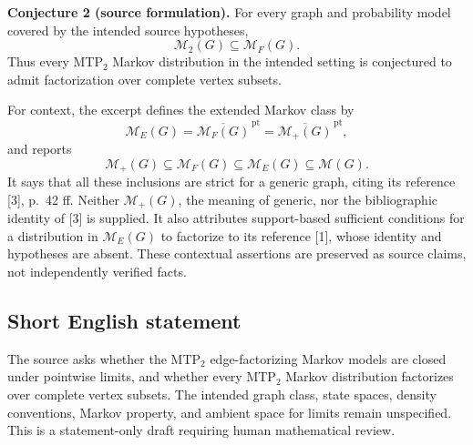 \documentclass[11pt]{article}
\begin{document}
\textbf{Conjecture 2 (source formulation).} For every graph and probability model covered by the intended source hypotheses,
\[
\mathcal M_2(G)\subseteq\mathcal M_F(G).
\]
Thus every MTP\(_2\) Markov distribution in the intended setting is conjectured to admit factorization over complete vertex subsets.

For context, the excerpt defines the extended Markov class by
\[
\mathcal M_E(G)=\overline{\mathcal M_F(G)}^{\,\mathrm{pt}}
=\overline{\mathcal M_+(G)}^{\,\mathrm{pt}},
\]
and reports
\[
\mathcal M_+(G)\subseteq\mathcal M_F(G)
\subseteq\mathcal M_E(G)\subseteq\mathcal M(G).
\]
It says that all these inclusions are strict for a generic graph, citing its reference [3], p.\ 42 ff. Neither \(\mathcal M_+(G)\), the meaning of generic, nor the bibliographic identity of [3] is supplied. It also attributes support-based sufficient conditions for a distribution in \(\mathcal M_E(G)\) to factorize to its reference [1], whose identity and hypotheses are absent. These contextual assertions are preserved as source claims, not independently verified facts.
\subsection{Short English statement}
The source asks whether the MTP\(_2\) edge-factorizing Markov models are closed under pointwise limits, and whether every MTP\(_2\) Markov distribution factorizes over complete vertex subsets. The intended graph class, state spaces, density conventions, Markov property, and ambient space for limits remain unspecified. This is a statement-only draft requiring human mathematical review.
\end{document}
